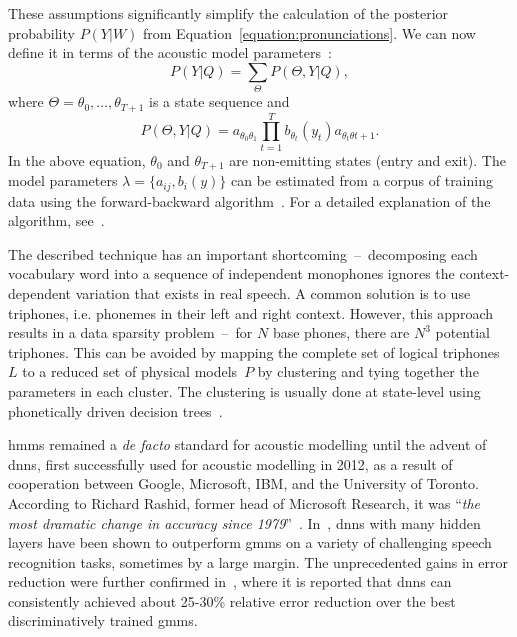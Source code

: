 These assumptions significantly simplify the calculation of the posterior probability $P(Y|W)$ from Equation~\ref{equation:pronunciations}. We can now define it in terms of the acoustic model parameters~\cite{lu2013subspace}:
\begin{equation}
  P(Y|Q)=\sum_{\Theta}P(\Theta, Y|Q),
\end{equation}
where $\Theta=\theta_{0}, \ldots, \theta_{T+1}$ is a state sequence and
\begin{equation}
  \label{equation:states}
  P(\Theta, Y|Q)=a_{\theta_{0}\theta_{1}}\prod_{t=1}^{T}b_{\theta_{t}}(y_{t})a_{\theta_{t}\theta{t+1}}.
\end{equation}
In the above equation, $\theta_{0}$ and $\theta_{T+1}$ are non-emitting states (entry and exit). The model parameters $\lambda=\{a_{ij}, b_{i}(y)\}$ can be estimated from a corpus of training data using the forward-backward algorithm~\cite{baum1970maximization}. For a detailed explanation of the algorithm, see~\cite{rabiner1986introduction}.

The described technique has an important shortcoming~--~decomposing each vocabulary word into a sequence of independent monophones ignores the context-dependent variation that exists in real speech. A common solution is to use triphones, i.e. phonemes in their left and right context. However, this approach results in a data sparsity problem~--~for $N$ base phones, there are $N^{3}$ potential triphones. This can be avoided by mapping the complete set of logical triphones~$L$ to a reduced set of physical models~$P$ by clustering and tying together the parameters in each cluster. The clustering is usually done at state-level using phonetically driven decision trees~\cite{gales2008application}.

\Glspl{hmm} remained a \textit{de facto} standard for acoustic modelling until the advent of \glspl{dnn}, first successfully used for acoustic modelling in 2012, as a result of cooperation between Google, Microsoft, IBM, and the University of Toronto. According to Richard Rashid, former head of Microsoft Research, it was \enquote{\textit{the most dramatic change in accuracy since 1979}}~\cite{markoff2012scientists}. In~\cite{hinton2012deep}, \glspl{dnn} with many hidden layers have been shown to outperform \glspl{gmm} on a variety of challenging speech recognition tasks, sometimes by a large margin. The unprecedented gains in error reduction were further confirmed in~\cite{pan2012investigation}, where it is reported that \glspl{dnn} can consistently achieved about 25-30\% relative error reduction over the best discriminatively trained \glspl{gmm}.

